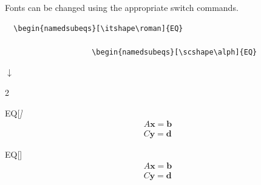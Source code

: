 \documentclass{article}
\begin{document}
Fonts can be changed using the appropriate switch commands.
\begin{tcolorbox}
  \begin{verbatim}
  \begin{namedsubeqs}[\itshape\roman]{EQ}
  
                    \begin{namedsubeqs}[\scshape\alph]{EQ}
  \end{verbatim}
\begin{center}$\downarrow$\end{center}
\VTrg
\begin{multicols}{2}
    \begin{namedsubeqs}{EQ}[\itshape\roman]
    \begin{align}
      A\mathbf{x} = \mathbf{b}   \\
      C\mathbf{y} = \mathbf{d}
    \end{align}
    \end{namedsubeqs}
    \begin{namedsubeqs}{EQ}[\scshape\alph]
    \begin{align}
      A\mathbf{x} = \mathbf{b}   \\
      C\mathbf{y} = \mathbf{d}
    \end{align}
    \end{namedsubeqs}
  \end{multicols}
\end{tcolorbox}
\end{document}
